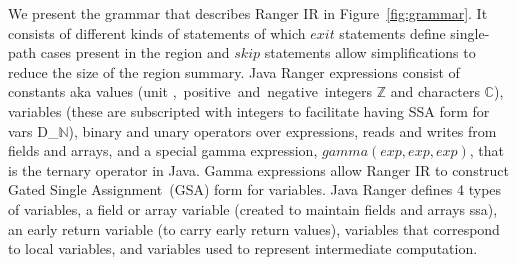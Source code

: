 %
We present the grammar that describes Ranger IR in Figure~\ref{fig:grammar}.
%
It consists of different kinds of statements of which
$exit$ statements define single-path cases present in the region and $skip$ statements allow simplifications to
reduce the size of the region summary.
%
Java Ranger expressions consist of constants aka values (unit \unit, positive and negative integers $\mathbb{Z}$ and
characters $\mathbb{C}$), variables (these are subscripted with integers to facilitate having SSA form for vars
D_$\mathbb{N}$), binary and unary operators over expressions, reads and writes from fields and arrays, and
a special gamma expression, $gamma(exp, exp, exp)$, that is the ternary operator in Java.
%
Gamma expressions allow Ranger IR to construct Gated Single Assignment~(GSA) form for variables.
%
Java Ranger defines 4 types of variables, a field or array variable (created to maintain fields and arrays ssa), an
early return variable (to carry early return values), variables that correspond to local variables, and variables used
to represent intermediate computation.
